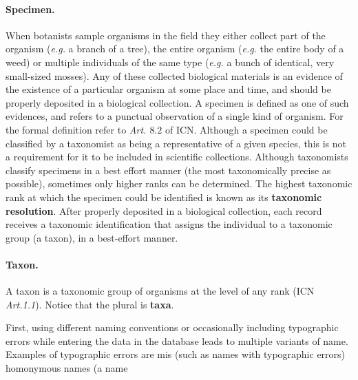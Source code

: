 \paragraph*{Specimen.}
When botanists sample organisms in the field they either collect part of the organism (\textit{e.g.} a branch of a tree), the entire organism (\textit{e.g.} the entire body of a weed) or multiple individuals of the same type (\textit{e.g.} a bunch of identical, very small-sized mosses). 
Any of these collected biological materials is an evidence of the existence of a particular organism at some place and time, and should be properly deposited in a biological collection. A specimen is defined as one of such evidences, and refers to a punctual observation of a single kind of organism. For the formal definition refer to \textit{Art. $8.2$} of ICN. 
Although a specimen could be classified by a taxonomist as being a representative of a given species, this is not a requirement for it to be included in scientific collections. Although taxonomists classify specimens in a best effort manner (the most taxonomically precise as possible), sometimes only higher ranks can be determined. The highest taxonomic rank at which the specimen could be identified is known as its \textbf{taxonomic resolution}.
After properly deposited in a biological collection, each record receives a taxonomic identification that assigns the individual to a taxonomic group (a taxon), in a best-effort manner.

\paragraph*{Taxon.}

A taxon is a taxonomic group of organisms at the level of any rank (ICN \textit{Art.1.1}). Notice that the plural is \textbf{taxa}.







\cite{Bhattacharya2007}

First, using different naming conventions or occasionally including typographic errors while entering the data in the database leads to multiple variants of name.
Examples of typographic errors are mis
(such as names with typographic errors) homonymous names (a name

